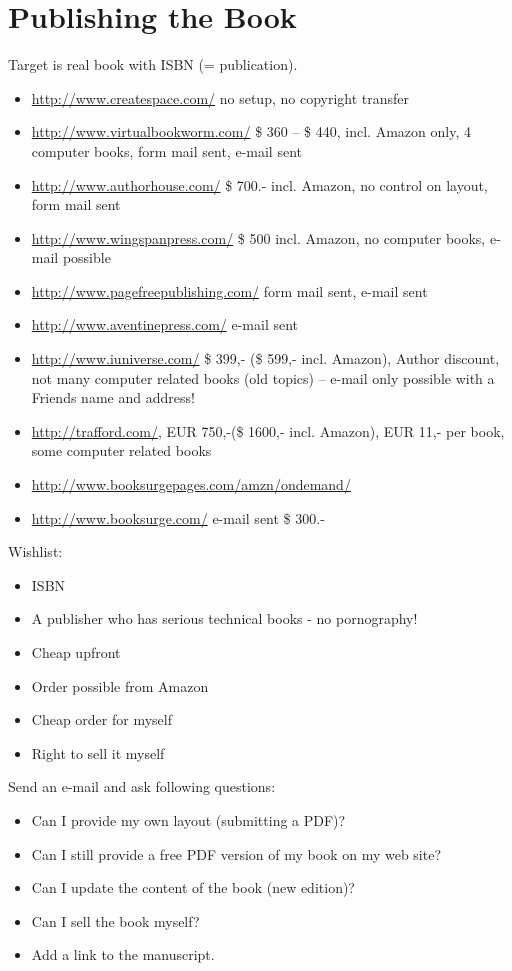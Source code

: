 \section{Publishing the Book}

Target is real book with ISBN (= publication).

\begin{itemize}
    \item \url{http://www.createspace.com/} no setup, no
        copyright transfer
    \item \url{http://www.virtualbookworm.com/} \$ 360 -- \$ 440, incl. Amazon only, 4 computer
    books, form mail sent, e-mail sent
    \item \url{http://www.authorhouse.com/} \$ 700.- incl. Amazon,
    no control on layout, form mail sent
    \item \url{http://www.wingspanpress.com/} \$ 500 incl. Amazon,
    no computer books, e-mail possible
    \item \url{http://www.pagefreepublishing.com/} form mail sent,
    e-mail sent
    \item \url{http://www.aventinepress.com/} e-mail sent
    \item \url{http://www.iuniverse.com/} \$ 399,- (\$ 599,- incl.
    Amazon), Author discount, not many computer related books (old
    topics) -- e-mail only possible with a Friends name and address!
    \item \url{http://trafford.com/}, EUR 750,-(\$ 1600,- incl. Amazon), EUR 11,- per
    book, some computer related books
    \item \url{http://www.booksurgepages.com/amzn/ondemand/}
    \item \url{http://www.booksurge.com/} e-mail sent \$ 300.-
\end{itemize}

Wishlist:
\begin{itemize}
    \item ISBN
    \item A publisher who has serious technical books - no pornography!
    \item Cheap upfront
    \item Order possible from Amazon
    \item Cheap order for myself
    \item Right to sell it myself
\end{itemize}

Send an e-mail and ask following questions:
\begin{itemize}
    \item Can I provide my own layout (submitting a PDF)?
    \item Can I still provide a free PDF version of my book on my
    web site?
    \item Can I update the content of the book (new edition)?
    \item Can I sell the book myself?
    \item Add a link to the manuscript.
\end{itemize}

